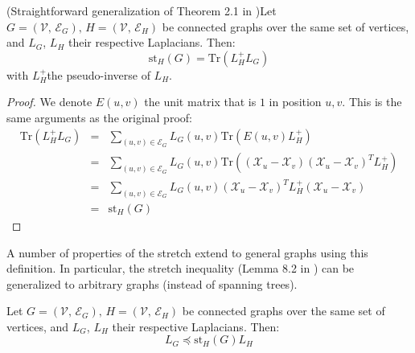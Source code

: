 \begin{lemma}\label{lem:stretch-trace}(Straightforward generalization
of Theorem 2.1 in \cite{Spielman2009b})Let $G=\left(\mathcal{V},\,\mathcal{E}_{G}\right),\, H=\left(\mathcal{V},\,\mathcal{E}_{H}\right)$
be connected graphs over the same set of vertices, and $L_{G}$, $L_{H}$
their respective Laplacians. Then:
\[
\text{st}_{H}\left(G\right)=\text{Tr}\left(L_{H}^{+}L_{G}\right)
\]
with $L_{H}^{+}$the pseudo-inverse of $L_{H}$.

\end{lemma}

\begin{proof}

We denote $E\left(u,v\right)$ the unit matrix that is $1$ in position
$u,v$. This is the same arguments as the original proof:
\begin{eqnarray*}
\text{Tr}\left(L_{H}^{+}L_{G}\right) & = & \sum_{\left(u,v\right)\in\mathcal{E}_{G}}L_{G}\left(u,v\right)\text{Tr}\left(E\left(u,v\right)L_{H}^{+}\right)\\
 & = & \sum_{\left(u,v\right)\in\mathcal{E}_{G}}L_{G}\left(u,v\right)\text{Tr}\left(\left(\mathcal{X}_{u}-\mathcal{X}_{v}\right)\left(\mathcal{X}_{u}-\mathcal{X}_{v}\right)^{T}L_{H}^{+}\right)\\
 & = & \sum_{\left(u,v\right)\in\mathcal{E}_{G}}L_{G}\left(u,v\right)\left(\mathcal{X}_{u}-\mathcal{X}_{v}\right)^{T}L_{H}^{+}\left(\mathcal{X}_{u}-\mathcal{X}_{v}\right)\\
 & = & \text{st}_{H}\left(G\right)
\end{eqnarray*}


\end{proof}

A number of properties of the stretch extend to general graphs using
this definition. In particular, the stretch inequality (Lemma 8.2
in \cite{Spielman2009a}) can be generalized to arbitrary graphs (instead
of spanning trees).

\begin{lemma}\label{lem:stretch-inequality}Let $G=\left(\mathcal{V},\,\mathcal{E}_{G}\right),\, H=\left(\mathcal{V},\,\mathcal{E}_{H}\right)$
be connected graphs over the same set of vertices, and $L_{G}$, $L_{H}$
their respective Laplacians. Then:
\[
L_{G}\preceq\text{st}_{H}\left(G\right)L_{H}
\]


\end{lemma}

